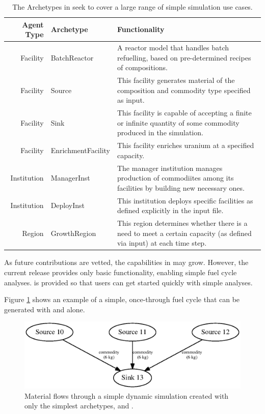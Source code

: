 \begin{table}[h]
\centering
\begin{tabularx}{\textwidth}{|r|l|X|}
\hline
\textbf{Agent Type} & \textbf{Archetype} & \textbf{Functionality} \\
\hline
Facility & BatchReactor & A reactor model that handles batch refuelling, based on pre-determined recipes of compositions. \\
Facility & Source & This facility generates material of the composition and commodity type specified as input.  \\
Facility & Sink & This facility is capable of accepting a finite or infinite quantity of some commodity produced in the simulation. \\
Facility & EnrichmentFacility & This facility enriches uranium at a specified capacity. \\
Institution & ManagerInst & The manager institution manages production of commodiites among its facilities by building new necessary ones. \\
Institution & DeployInst &  This institution deploys specific facilities as defined explicitly in the input file. \\
Region & GrowthRegion & This region determines whether there is a need to meet a certain capacity (as defined via input) at each time step. \\
\hline
\end{tabularx}
\caption{The Archetypes in \Cycamore seek to cover a large range of simple simulation use cases.}
\label{tab:cycamore}
\end{table}

As future contributions are vetted, the capabilities in \Cycamore may grow. 
However, the current \Cycamore release provides only 
basic functionality, enabling simple fuel cycle analyses. 
\Cycamore is provided so that users can get started quickly with simple 
analyses.

Figure \ref{fig:simplesim} shows an example of a simple, once-through fuel cycle 
that can be generated with \Cycamore and \Cyclus alone.

\begin{figure}[htbp!]
\begin{center}
\includegraphics{./images/simplesim}
\end{center}
\caption{Material flows through a simple dynamic simulation created with only the simplest \Cycamore archetypes,  and .}
\label{fig:simplesim}
\end{figure}
